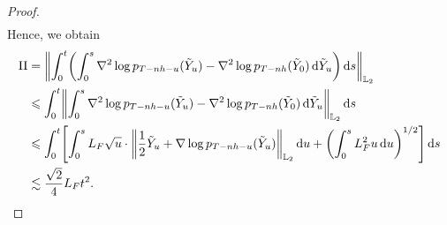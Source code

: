 \begin{proof}
\begin{align*}
\end{align*}
Hence, we obtain 
\begin{equation}
    \begin{aligned}
        \rm{II}&=\left\lVert\int_0^t\left(\int_0^s\nabla^2\log p_{T-nh-u}(\tilde{Y}_u)-\nabla^2\log p_{T-nh}(\tilde{Y}_0)\rmd\tilde{Y}_u\right)\rmd s\right\rVert_{\Ltwo}\\
        &\leqslant\int_0^t\left\lVert\int_0^s\nabla^2\log p_{T-nh-u}(\tilde{Y}_u)-\nabla^2\log p_{T-nh}(\tilde{Y}_0)\rmd\tilde{Y}_u\right\rVert_{\Ltwo}\rmd s\\
        &\leqslant \int_0^t\left[\int_0^sL_F\sqrt{u}\cdot\left\lVert\dfrac{1}{2}\tilde{Y}_u+\nabla\log p_{T-nh-u}(\tilde{Y}_u)\right\rVert_{\Ltwo}\rmd u+\left(\int_0^sL_F^2u\rmd u\right)^{1/2}\right]\rmd s\\
        &\lesssim \dfrac{\sqrt{2}}{4}L_Ft^2.
    \end{aligned}
    \label{eq:SOterm2}
\end{equation}



\end{proof}
